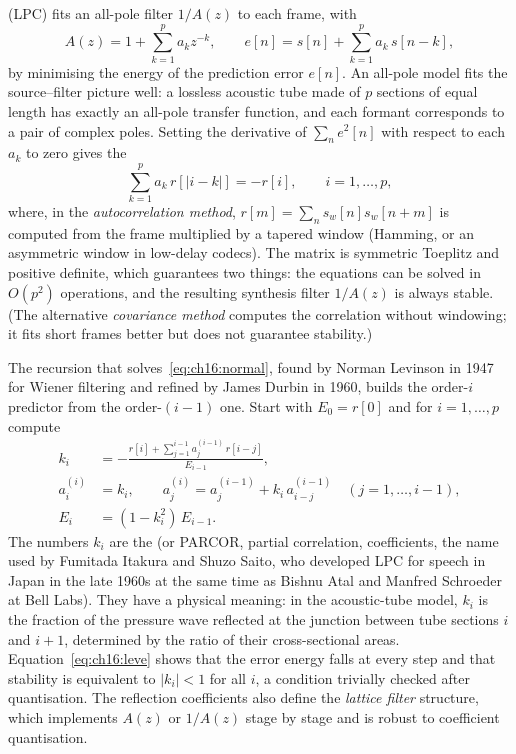  (LPC) fits an all-pole filter $1/A(z)$ to each frame, with
\begin{equation}
A(z)=1+\sum_{k=1}^{p}a_kz^{-k},\qquad e[n]=s[n]+\sum_{k=1}^pa_k\,s[n-k],
\label{eq:ch16:lpc}
\end{equation}
by minimising the energy of the prediction error $e[n]$. An all-pole model fits the source--filter
picture well: a lossless acoustic tube made of $p$ sections of equal length has exactly an all-pole
transfer function, and each formant corresponds to a pair of complex poles. Setting the derivative
of $\sum_ne^2[n]$ with respect to each $a_k$ to zero gives the 
\begin{equation}
\sum_{k=1}^pa_k\,r[|i-k|]=-r[i],\qquad i=1,\dots,p,
\label{eq:ch16:normal}
\end{equation}
where, in the \emph{autocorrelation method}, $r[m]=\sum_n s_w[n]s_w[n+m]$ is computed from the
frame multiplied by a tapered window (Hamming, or an asymmetric window in low-delay codecs). The
matrix is symmetric Toeplitz and positive definite, which guarantees two things: the equations can
be solved in $O(p^2)$ operations, and the resulting synthesis filter $1/A(z)$ is always stable. (The
alternative \emph{covariance method} computes the correlation without windowing; it fits short frames
better but does not guarantee stability.)

\begin{deeper}
The recursion that solves~\eqref{eq:ch16:normal}, found by Norman Levinson in 1947 for Wiener
filtering and refined by James Durbin in 1960, builds the order-$i$ predictor from the order-$(i-1)$
one. Start with $E_0=r[0]$ and for $i=1,\dots,p$ compute
\begin{align}
k_i&=-\frac{r[i]+\sum_{j=1}^{i-1}a_j^{(i-1)}\,r[i-j]}{E_{i-1}},\label{eq:ch16:levk}\\
a_i^{(i)}&=k_i,\qquad a_j^{(i)}=a_j^{(i-1)}+k_i\,a_{i-j}^{(i-1)}\quad(j=1,\dots,i-1),\\
E_i&=(1-k_i^2)\,E_{i-1}.\label{eq:ch16:leve}
\end{align}
The numbers $k_i$ are the  (or PARCOR, partial correlation,
coefficients, the name used by Fumitada Itakura and Shuzo Saito, who developed LPC for speech in
Japan in the late 1960s at the same time as Bishnu Atal and Manfred Schroeder at Bell Labs). They
have a physical meaning: in the acoustic-tube model, $k_i$ is the fraction of the pressure wave
reflected at the junction between tube sections $i$ and $i+1$, determined by the ratio of their
cross-sectional areas. Equation~\eqref{eq:ch16:leve} shows that the error energy falls at every step
and that stability is equivalent to $|k_i|<1$ for all $i$, a condition trivially checked after
quantisation. The reflection coefficients also define the \emph{lattice filter} structure, which
implements $A(z)$ or $1/A(z)$ stage by stage and is robust to coefficient quantisation.
\end{deeper}

